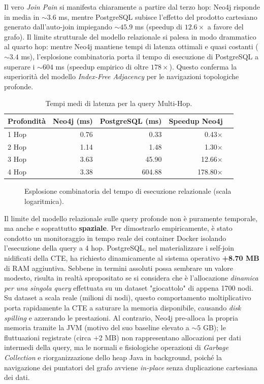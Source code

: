 Il vero \textit{Join Pain} si manifesta chiaramente a partire dal terzo hop: Neo4j risponde in media in $\sim 3.6$ ms, mentre PostgreSQL subisce l'effetto del prodotto cartesiano generato dall'auto-join impiegando $\sim 45.9$ ms (speedup di $12.6\times$ a favore del grafo). Il limite strutturale del modello relazionale si palesa in modo drammatico al quarto hop: mentre Neo4j mantiene tempi di latenza ottimali e quasi costanti ($\sim 3.4$ ms), l'esplosione combinatoria porta il tempo di esecuzione di PostgreSQL a superare i $\sim 604$ ms (speedup empirico di oltre $178\times$). Questo conferma la superiorità del modello \textit{Index-Free Adjacency} per le navigazioni topologiche profonde.

\begin{table}[hbt!]
  \centering
  \begin{tabular}{lrrrr}
    \hline
    \textbf{Profondità} & \textbf{Neo4j (ms)} & \textbf{PostgreSQL (ms)} & \textbf{Speedup Neo4j} \\
    \hline
    1 Hop & 0.76 & 0.33 & 0.43$\times$ \\
    2 Hop & 1.14 & 1.48 & 1.30$\times$ \\
    3 Hop & 3.63 & 45.90 & 12.66$\times$ \\
    4 Hop & 3.38 & 604.88 & 178.80$\times$ \\
    \hline
  \end{tabular}
  \caption{Tempi medi di latenza per la query Multi-Hop.}
  \label{tab:multihop_results}
\end{table}

\begin{figure}[hbt!]
  \centering
  
  \caption{Esplosione combinatoria del tempo di esecuzione relazionale (scala logaritmica).}
  \label{fig:multihop_plot}
\end{figure}

Il limite del modello relazionale sulle query profonde non è puramente temporale, ma anche e soprattutto \textbf{spaziale}. Per dimostrarlo empiricamente, è stato condotto un monitoraggio in tempo reale dei container Docker isolando l'esecuzione della query a 4 hop. PostgreSQL, nel materializzare i self-join nidificati della CTE, ha richiesto dinamicamente al sistema operativo \textbf{+8.70 MB} di RAM aggiuntiva. Sebbene in termini assoluti possa sembrare un valore modesto, risulta in realtà spropositato se si considera che è l'allocazione \textit{dinamica per una singola query} effettuata su un dataset "giocattolo" di appena 1700 nodi. Su dataset a scala reale (milioni di nodi), questo comportamento moltiplicativo porta rapidamente la CTE a saturare la memoria disponibile, causando \textit{disk spilling} e azzerando le prestazioni. Al contrario, Neo4j pre-alloca la propria memoria tramite la JVM (motivo del suo baseline elevato a $\sim 5$ GB); le fluttuazioni registrate (circa +2 MB) non rappresentano allocazioni per dati intermedi della query, ma le normali e fisiologiche operazioni di \textit{Garbage Collection} e riorganizzazione dello heap Java in background, poiché la navigazione dei puntatori del grafo avviene \textit{in-place} senza duplicazione cartesiana dei dati.

